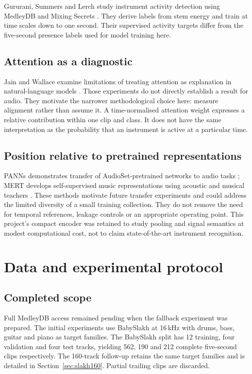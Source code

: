 \documentclass[10pt,a4paper]{article}
\begin{document}
Gururani, Summers and Lerch study instrument activity detection using MedleyDB and Mixing Secrets \cite{iad}. They derive labels from stem energy and train at time scales down to one second. Their supervised activity targets differ from the five-second presence labels used for model training here.

\subsection{Attention as a diagnostic}
Jain and Wallace examine limitations of treating attention as explanation in natural-language models \cite{jain}. Those experiments do not directly establish a result for audio. They motivate the narrower methodological choice here: measure alignment rather than assume it. A time-normalised attention weight expresses a relative contribution within one clip and class. It does not have the same interpretation as the probability that an instrument is active at a particular time.

\subsection{Position relative to pretrained representations}
PANNs demonstrates transfer of AudioSet-pretrained networks to audio tasks \cite{panns}; MERT develops self-supervised music representations using acoustic and musical teachers \cite{mert}. These methods motivate future transfer experiments and could address the limited diversity of a small training collection. They do not remove the need for temporal references, leakage controls or an appropriate operating point. This project's compact encoder was retained to study pooling and signal semantics at modest computational cost, not to claim state-of-the-art instrument recognition.

\section{Data and experimental protocol}
\subsection{Completed scope}
Full MedleyDB access remained pending when the fallback experiment was prepared. The initial experiments use BabySlakh at 16\,kHz with drums, bass, guitar and piano as target families. The BabySlakh split has 12 training, four validation and four test tracks, yielding 562, 190 and 212 complete five-second clips respectively. The 160-track follow-up retains the same target families and is detailed in Section~\ref{sec:slakh160}. Partial trailing clips are discarded.
\end{document}
